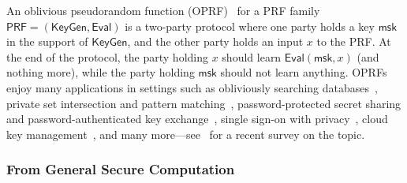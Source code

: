 \documentclass[journal=tosc,submission]{iacrtrans}
\theoremstyle{theorem}
\newcommand\PRF{\ensuremath{\mathsf{PRF}}\xspace}
\newcommand\msk{\ensuremath{\mathsf{msk}}\xspace}
\newcommand\KeyGen{\ensuremath{\mathsf{KeyGen}}\xspace}
\newcommand\Eval{\ensuremath{\mathsf{Eval}}\xspace}
\begin{document}
An oblivious pseudorandom function (OPRF)~\cite{TCC:FIPR05} for a PRF family $\PRF = (\KeyGen, \Eval)$ is a two-party protocol where one party holds a key $\msk$ in the support of $\KeyGen$, and the other party holds an input $x$ to the PRF. At the end of the protocol, the party holding $x$ should learn $\Eval(\msk,x)$ (and nothing more), while the party holding $\msk$ should not learn anything. OPRFs enjoy many applications in settings such as obliviously searching databases~\cite{TCC:FIPR05}, private set intersection and pattern matching~\cite{TCC:HazLin08,CCS:KKRT16}, password-protected secret sharing and password-authenticated key exchange~\cite{AC:JarKiaKra14}, single sign-on with privacy~\cite{EUROSP:BFHLY20}, cloud key management~\cite{CCS:JarKraRes19}, and many more---see~\cite{EUROSP:CasHesLeh22} for a recent survey on the topic.

\subsubsection{From General Secure Computation}
\end{document}
